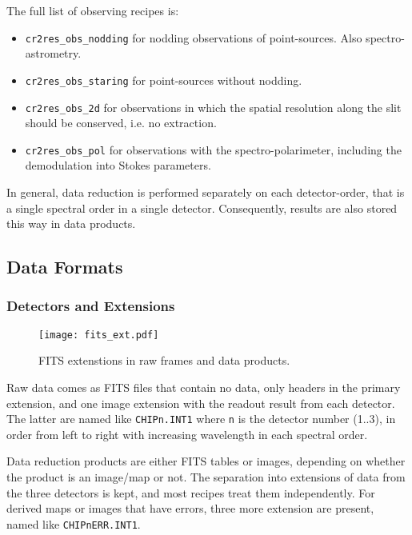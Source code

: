 The full list of observing recipes is:
\begin{itemize}
    \item \texttt{cr2res\_obs\_nodding} for nodding observations of
        point-sources. Also spectro-astrometry.
    \item \texttt{cr2res\_obs\_staring} for point-sources without nodding.
    \item \texttt{cr2res\_obs\_2d} for observations in which the spatial
        resolution along the slit should be conserved, i.e. no extraction.
    \item \texttt{cr2res\_obs\_pol} for observations with the spectro-polarimeter,
        including the demodulation into Stokes parameters. 
\end{itemize}


In general, data reduction is performed separately on each detector-order,
that is a single spectral order in a single detector.
Consequently, results are also stored this way in data products.


\subsection{Data Formats}
\label{sec:data-fmt-quick}

\subsubsection{Detectors and Extensions}
\label{sec:extns}
\begin{figure}[!tb]
  \begin{center}
    \texttt{[image: fits\_ext.pdf]}
  \end{center}
  \caption{
    \label{fig:fits_ext}
    FITS extenstions in raw frames and data products.
    }
\end{figure}

Raw data comes as FITS files that contain no data, only headers in the
primary extension, and one image extension with the readout result from each
detector. The latter are named like \texttt{CHIPn.INT1} where \texttt{n} is
the detector number (1..3), in order from left to right with increasing
wavelength in each spectral order.

Data reduction products are either FITS tables or images, depending on whether
the product is an image/map or not. The separation into extensions of data from
the three detectors is kept, and most recipes treat them independently. For
derived maps or images that have errors, three more extension are present, named
like \texttt{CHIPnERR.INT1}.

